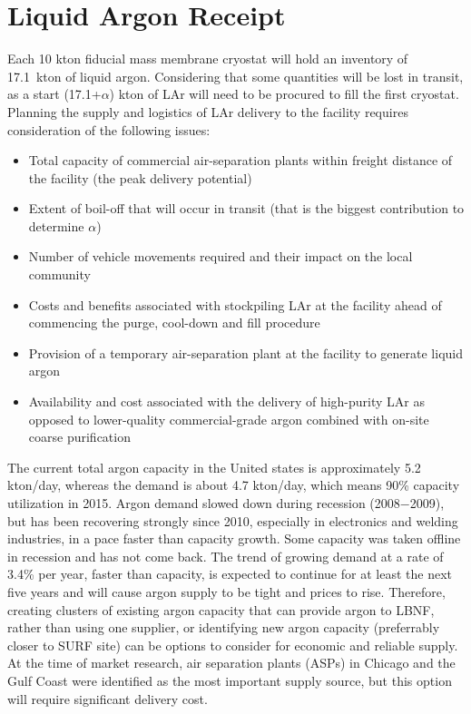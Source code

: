 \section{Liquid Argon Receipt}

Each 10 kton fiducial mass membrane cryostat will hold an inventory 
of 17.1~kton of liquid argon. Considering that some quantities will 
be lost in transit, as a start (17.1+$\alpha$) kton of LAr will need to be 
procured to fill the first cryostat. Planning the supply and logistics 
of LAr delivery to the facility requires consideration of the following issues:

\begin{itemize}
\item  Total capacity of commercial air-separation plants within freight 
distance of the facility (the peak delivery potential)
\item Extent of boil-off that will occur in transit (that is the biggest 
contribution to determine $\alpha$)
\item Number of vehicle movements required and their impact on the local community
\item Costs and benefits associated with stockpiling LAr at the facility
ahead of commencing the purge, cool-down and fill procedure
\item Provision of a temporary air-separation plant at the facility 
to generate liquid argon
\item Availability and cost associated with the delivery of high-purity 
LAr as opposed to lower-quality commercial-grade argon combined with 
on-site coarse purification
\end{itemize}

The current total argon capacity in the United states is approximately 5.2 kton/day, 
whereas the demand is about 4.7 kton/day, which means 90\% capacity utilization in 
2015. Argon demand slowed down during recession (2008$-$2009), but has been 
recovering strongly since 2010, especially in electronics and welding industries, 
in a pace faster than capacity growth. Some capacity was taken offline in recession 
and has not come back. The trend of growing demand at a rate of 3.4\% per year, 
faster than capacity, is expected to continue for at least the next five years and 
will cause argon supply to be tight and prices to rise. Therefore, creating clusters 
of existing argon capacity that can provide argon to LBNF, rather than using one 
supplier, or identifying new argon capacity (preferrably closer to SURF site) can 
be options to consider for economic and reliable supply. At the time of market 
research, air separation plants (ASPs) in Chicago and the Gulf Coast were 
identified as the most important supply source, but this option will 
require significant delivery cost.

